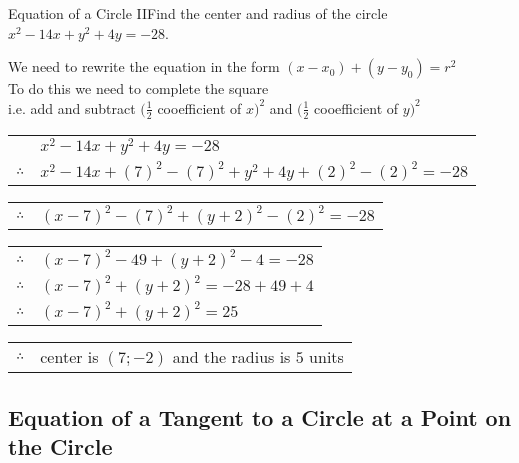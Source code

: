 \begin{wex}{Equation of a Circle II}{Find the center and radius of the circle \\ $x^2 - 14 x + y^2 + 4y = -28$.}{
We need to rewrite the equation in the form  $(x - x_0) + (y - y_0) = r^2$ \\
To do this we need to complete the square \\
i.e. add and subtract $(\frac{1}{2}$ cooefficient of $x)^2$ and $(\frac{1}{2}$ cooefficient of $y)^2$ \\

\begin{tabular}{ll}
& $x^2 - 14 x + y^2 + 4y = -28$ \\
$\therefore$ & $x^2 - 14 x + (7)^2 -(7)^2 + y^2 + 4y + (2)^2 -(2)^2 = -28$ \\
\end{tabular}

\begin{tabular}{ll}
$\therefore$ & $(x - 7)^2 -(7)^2 + (y + 2)^2 -(2)^2 = -28$ \\
\end{tabular}

\begin{tabular}{ll}
$\therefore$ & $(x - 7)^2 -49 + (y + 2)^2 -4 = -28$ \\
$\therefore$ & $(x - 7)^2 + (y + 2)^2 = -28 + 49 + 4$ \\ 
$\therefore$ & $(x - 7)^2 + (y + 2)^2 = 25$ \\
\end{tabular}

\begin{tabular}{ll}
$\therefore$ & center is $ (7;-2)$ and the radius is $5$ units
\end{tabular}
}
\end{wex}

\subsection{Equation of a Tangent to a Circle at a Point on the Circle}


